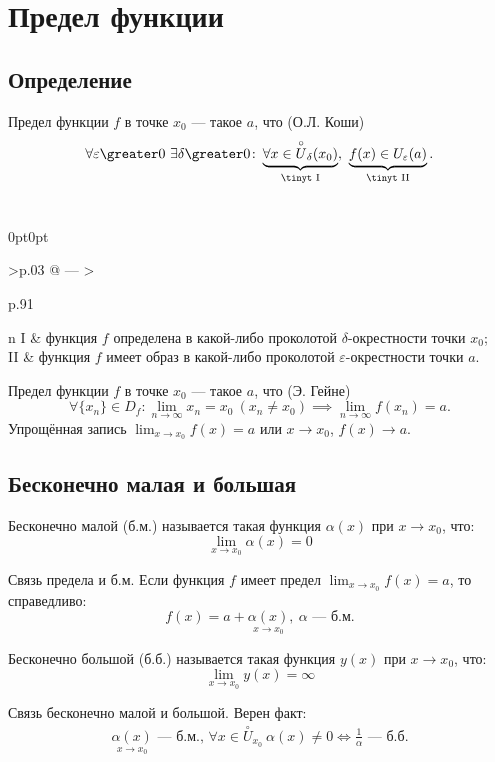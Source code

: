 \section{Предел функции}

\subsection{Определение}

{\bold Предел} функции $f$ в точке $x_0$ --- такое $a$, что {\ital\color{desc} (О.Л. Коши)}
$$\forall\varepsilon\greater 0\ \exists\delta\greater 0\colon\underbrace{
\forall x\in\overset{\circ}{U}_\delta(x_0)}_{\text{\tinyt I}},\ \underbrace{f(x)\in U_\varepsilon(a)}_{\text{\tinyt II}}.$$\\
\begin{tabularc}{0pt}{0pt}{>{\raggedleft\arraybackslash}p{.03\linewidth} @{ --- } 
>{\raggedright\arraybackslash}p{.91\linewidth}}{n}
I & функция $f$ определена в какой-либо проколотой $\delta$-окрестности точки $x_0$;
\\[18pt]
II & функция $f$ имеет образ в какой-либо проколотой $\varepsilon$-окрестности точки 
$a$.  
\end{tabularc}

{\bold Предел} функции $f$ в точке $x_0$ --- такое
$a$, что {\ital\color{desc} (Э. Гейне)}
$$\forall\{x_n\}\in D_f\colon\lim_{n\to\infty}x_n=x_0\ (x_n\neq x_0)\implies\lim_{n\to
\infty}f(x_n)=a.$$
Упрощённая запись $\lim_{x\to x_0}f(x)=a$ или $x\to x_0$, $f(x)\to a$.

\subsection{Бесконечно малая и большая}

{\bold Бесконечно малой} {\ital\color{desc}(б.м.)} называется такая функция $\alpha(x)$ при $x\to x_0$, что:
$$\lim_{x\to x_0}\alpha(x)=0$$
\begin{theorem}
{\bold Связь предела и б.м.} Если функция $f$ имеет предел $\lim_{x\to x_0}f(x)=a$, то справедливо:
$$f(x)=a+\underset{x\to x_0}{\alpha(x)},\ \alpha\text{ --- б.м.}$$
\end{theorem}

{\bold Бесконечно большой} {\ital\color{desc}(б.б.)} называется такая функция $y(x)$ при $x\to x_0$, что:
$$\lim_{x\to x_0}y(x)=\infty$$
\begin{theorem}
{\bold Связь бесконечно малой и большой.} Верен факт: 
\begin{align*}
\underset{x\to x_0}{\alpha(x)}\text{ --- б.м., }\forall x\in\overset{\circ}{U}_{x_0}\ \alpha(x)\neq 0\iff\frac{1}{\alpha}\text{ --- б.б.}
\end{align*}
\end{theorem}

